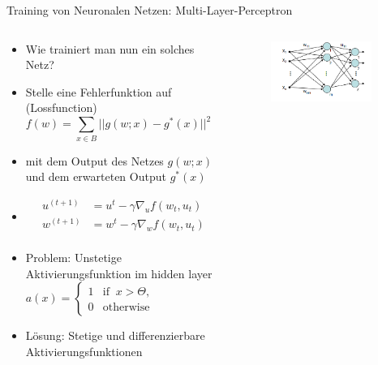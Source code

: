 \documentclass[aspectratio=1610, xcolor=dvipsnames, 9pt]{beamer}
\begin{document}
      \begin{frame}{Training von Neuronalen Netzen: Multi-Layer-Perceptron}
        \begin{columns}
          \begin{column}{0.7\textwidth}
            \begin{itemize}
              \item Wie trainiert man nun ein solches Netz?
              \item Stelle eine Fehlerfunktion auf (Lossfunction)
              \begin{equation}
                f(w) = \sum_{x\in B} || g(w; x) - g^*(x) ||^2 \quad \rightarrow \text{  min  }
              \end{equation} 
              \item mit dem Output des Netzes $ g(w;x) $ und dem erwarteten Output $ g^*(x) $ 
              \item 
              \begin{align}
                 u^{(t+1)} &= u^t - \gamma \nabla_u f(w_t , u_t) \\
                 w^{(t+1)} &= w^t - \gamma \nabla_w f(w_t , u_t) \\
              \end{align}
              \item Problem: Unstetige Aktivierungsfunktion im hidden layer  $ a(x) = \begin{cases}1 & \text{if }\ x > \Theta,\\0 & \text{otherwise}\end{cases}$
              \item Lösung: Stetige und differenzierbare Aktivierungsfunktionen
            \end{itemize}
          \end{column}
          \begin{column}{0.3\textwidth}
            \begin{figure}
              \centering
                          \includegraphics[width=0.9\textwidth]{images/MLP.png}
              \end{figure}
          \end{column}
        \end{columns}
      \end{frame}
\end{document}

